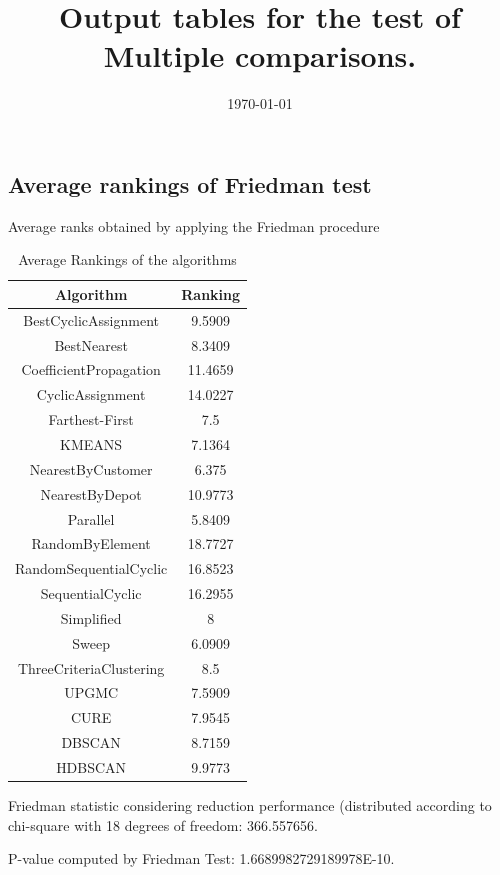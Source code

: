 \documentclass[a4paper,10pt]{article}
\title{Output tables for the test of Multiple comparisons.}
\author{}
\date{\today}
\begin{document}
\begin{landscape}
\pagestyle{empty}
\maketitle
\thispagestyle{empty}
\section{Average rankings of Friedman test}



Average ranks obtained by applying the Friedman procedure

\begin{table}[!htp]
\centering
\begin{tabular}{|c|c|}\hline
Algorithm&Ranking\\\hline
BestCyclicAssignment & 9.5909\\
BestNearest & 8.3409\\
CoefficientPropagation & 11.4659\\
CyclicAssignment & 14.0227\\
Farthest-First & 7.5\\
KMEANS & 7.1364\\
NearestByCustomer & 6.375\\
NearestByDepot & 10.9773\\
Parallel & 5.8409\\
RandomByElement & 18.7727\\
RandomSequentialCyclic & 16.8523\\
SequentialCyclic & 16.2955\\
Simplified & 8\\
Sweep & 6.0909\\
ThreeCriteriaClustering & 8.5\\
UPGMC & 7.5909\\
CURE & 7.9545\\
DBSCAN & 8.7159\\
HDBSCAN & 9.9773\\
\hline
\end{tabular}
\caption{Average Rankings of the algorithms}
\end{table}

Friedman statistic considering reduction performance (distributed according to chi-square with 18 degrees of freedom: 366.557656.

P-value computed by Friedman Test: 1.6689982729189978E-10.\newline


\end{landscape}
\end{document}
